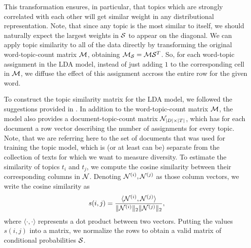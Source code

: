 This transformation ensures, in particular, that topics which are
strongly correlated with each other will get similar weight in any
distributional representation. Note, that since any topic is the most
similar to itself, we should naturally expect the largest weights in
${\mathcal S}$ to appear on the diagonal. We can apply topic similarity to all
of the data directly by transforming the original word-topic-count
matrix ${\mathcal M}$, obtaining ${\mathcal M}_{\mathcal S}={\mathcal M}{\mathcal S}^T$. So, for each word-topic
assignment in the LDA model, instead of just adding $1$ to the
corresponding cell in ${\mathcal M}$, we diffuse the effect of this assignment
accross the entire row for the given word.

To construct the topic similarity matrix for the LDA model, we
followed the suggestions provided in \cite{bache:2013}. In addition to
the word-topic-count matrix ${\mathcal M}$, the model also provides a
document-topic-count matrix ${\mathcal N}_{|D|\times|T|}$, which has for each
document a row vector describing the number of assignments for
every topic. Note, that we are referring here to the set of documents
that was used for training the topic model, which is (or at least can
be) separate from the collection of texts for which we want to measure
diversity. To estimate the similarity of topics $t_i$ and $t_j$, we
compute the cosine similarity between their corresponding columns in
${\mathcal N}$. Denoting ${\mathcal N}^{(i)},{\mathcal N}^{(j)}$ as those column vectors, we
write the cosine similarity as
\begin{align*}
s(i,j) = \frac{\langle{\mathcal N}^{(i)}, {\mathcal N}^{(j)}\rangle}{\|{\mathcal N}^{(i)}\|_2\|{\mathcal N}^{(j)}\|_2},
\end{align*}
where $\langle\cdot,\cdot\rangle$ represents a dot product between
two vectors. Putting the values $s(i,j)$ into a matrix, we normalize
the rows to obtain a valid matrix of conditional probabilities ${\mathcal S}$.


